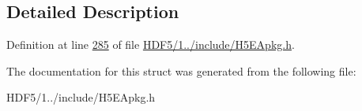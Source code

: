 \subsection{Detailed Description}


Definition at line \hyperlink{_h_d_f5_21_810_81_2include_2_h5_e_apkg_8h_source_l00285}{285} of file \hyperlink{_h_d_f5_21_810_81_2include_2_h5_e_apkg_8h_source}{H\+D\+F5/1../include/\+H5\+E\+Apkg.\+h}.



The documentation for this struct was generated from the following file\+:\begin{DoxyCompactItemize}
\item 
H\+D\+F5/1../include/\+H5\+E\+Apkg.\+h\end{DoxyCompactItemize}

